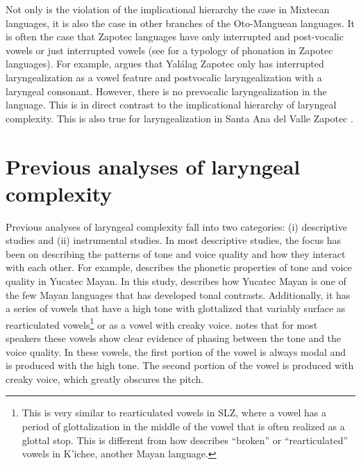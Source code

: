 Not only is the violation of the implicational hierarchy the case in Mixtecan languages, it is also the case in other branches of the Oto-Manguean languages. It is often the case that Zapotec languages have only interrupted and post-vocalic vowels or just interrupted vowels (see \cite{ariza-garciaPhonationTypesTones2018} for a typology of phonation in Zapotec languages). For example, \citet{avelinoTopicsYalalagZapotec2004,avelinoAcousticElectroglottographicAnalyses2010} argues that Yalálag Zapotec only has interrupted laryngealization as a vowel feature and postvocalic laryngealization with a laryngeal consonant. However, there is no prevocalic laryngealization in the language. This is in direct contrast to the implicational hierarchy of laryngeal complexity. This is also true for laryngealization in Santa Ana del Valle Zapotec \citep{espositoSantaAnaValle2004,espositoAcousticElectroglottographicStudy2012}.

\section{Previous analyses of laryngeal complexity}\label{sec:previous_analyses}

Previous analyses of laryngeal complexity fall into two categories: (i) descriptive studies and (ii) instrumental studies. In most descriptive studies, the focus has been on describing the patterns of tone and voice quality and how they interact with each other. For example, \citet{frazierPhoneticsYucatecMaya2013} describes the phonetic properties of tone and voice quality in Yucatec Mayan. In this study, \citeauthor{frazierPhoneticsYucatecMaya2013} describes how Yucatec Mayan is one of the few Mayan languages that has developed tonal contrasts. Additionally, it has a series of vowels that have a high tone with glottalized that variably surface as rearticulated vowels\footnote{This is very similar to rearticulated vowels in SLZ, where a vowel has a period of glottalization in the middle of the vowel that is often realized as a glottal stop. This is different from how \citet{bairdPhoneticPhonologicalRealizations2011} describes ``broken'' or ``rearticulated'' vowels in K'ichee, another Mayan language.} or as a vowel with creaky voice. \citeauthor{frazierPhoneticsYucatecMaya2013} notes that for most speakers these vowels show clear evidence of phasing between the tone and the voice quality. In these vowels, the first portion of the vowel is always modal and is produced with the high tone. The second portion of the vowel is produced with creaky voice, which greatly obscures the pitch. 

